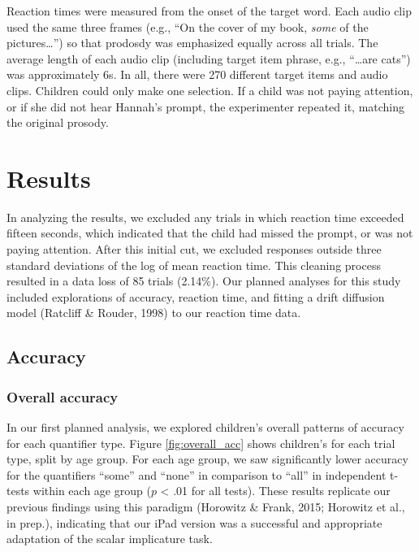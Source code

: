 \documentclass[10pt, letterpaper]{article}
\begin{document}
Reaction times were measured from the onset of the target word. Each
audio clip used the same three frames (e.g., ``On the cover of my book,
\emph{some} of the pictures\ldots{}'') so that prodosdy was emphasized
equally across all trials. The average length of each audio clip
(including target item phrase, e.g., ``\ldots{}are cats'') was
approximately 6s. In all, there were 270 different target items and
audio clips. Children could only make one selection. If a child was not
paying attention, or if she did not hear Hannah's prompt, the
experimenter repeated it, matching the original prosody.

\section{Results}\label{results}

In analyzing the results, we excluded any trials in which reaction time
exceeded fifteen seconds, which indicated that the child had missed the
prompt, or was not paying attention. After this initial cut, we excluded
responses outside three standard deviations of the log of mean reaction
time. This cleaning process resulted in a data loss of 85 trials
(2.14\%). Our planned analyses for this study included explorations of
accuracy, reaction time, and fitting a drift diffusion model (Ratcliff
\& Rouder, 1998) to our reaction time data.

\subsection{Accuracy}\label{accuracy}

\subsubsection{Overall accuracy}\label{overall-accuracy}

In our first planned analysis, we explored children's overall patterns
of accuracy for each quantifier type. Figure \ref{fig:overall_acc} shows
children's for each trial type, split by age group. For each age group,
we saw significantly lower accuracy for the quantifiers ``some'' and
``none'' in comparison to ``all'' in independent t-tests within each age
group (\(p\) \textless{} .01 for all tests). These results replicate our
previous findings using this paradigm (Horowitz \& Frank, 2015; Horowitz
et al., in prep.), indicating that our iPad version was a successful and
appropriate adaptation of the scalar implicature task.
\end{document}

